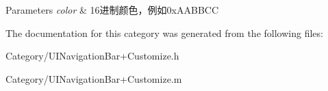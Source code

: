 \begin{DoxyParams}{Parameters}
{\em color} & 16进制颜色，例如0x\+A\+A\+B\+B\+C\+C \\
\hline
\end{DoxyParams}


The documentation for this category was generated from the following files\+:\begin{DoxyCompactItemize}
\item 
Category/U\+I\+Navigation\+Bar+\+Customize.\+h\item 
Category/U\+I\+Navigation\+Bar+\+Customize.\+m\end{DoxyCompactItemize}
